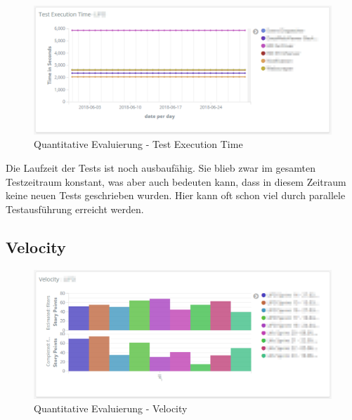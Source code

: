\begin{savenotes}
    \begin{figure}[H]
      \centering
      \includegraphics[width=1.0\textwidth]{img/eval-test-exec.png}
      \caption{Quantitative Evaluierung {-} Test Execution Time}\label{fig:eval_test_execution}
    \end{figure}
\end{savenotes}

Die Laufzeit der Tests ist noch ausbaufähig.
Sie blieb zwar im gesamten Testzeitraum konstant, was aber auch bedeuten kann, dass in diesem Zeitraum keine neuen Tests geschrieben wurden.
Hier kann oft schon viel durch parallele Testausführung erreicht werden.

\clearpage
\subsection*{Velocity}

\begin{savenotes}
    \begin{figure}[H]
      \centering
      \includegraphics[width=1.0\textwidth]{img/eval-velocity.png}
      \caption{Quantitative Evaluierung {-} Velocity}\label{fig:eval_velocity}
    \end{figure}
\end{savenotes}

